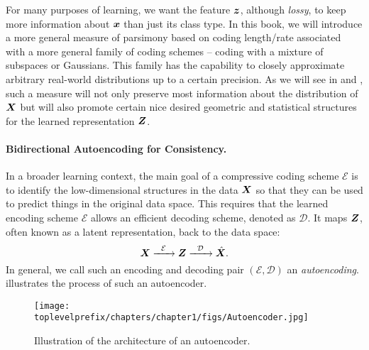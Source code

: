 \documentclass[../../book-main.tex]{subfiles}
\begin{document}
For many purposes of learning, we want the feature $\bm{z}$, although {\em lossy}, to keep more information about $\bm{x}$ than just its class type. In this book, we will introduce a more general measure of parsimony based on coding length/rate associated with a more general family of coding schemes -- coding with a mixture of subspaces or Gaussians. This family has the capability to closely approximate arbitrary real-world distributions up to a certain precision. As we will see in  and , such a measure will not only preserve most information about the distribution of $\bm{X}$ but will also promote certain nice desired geometric and statistical structures for the learned representation $\bm{Z}$. 


\paragraph{Bidirectional Autoencoding for Consistency.}
In a broader learning context, the main goal of a compressive coding scheme $\mathcal{E}$ is to identify the low-dimensional structures in the data $\bm{X}$ so that they can be used to predict things in the original data space. This requires that the learned encoding scheme $\mathcal{E}$ allows an efficient decoding scheme, denoted as $\mathcal D$. It maps $\bm{Z}$, often known as a latent representation, back to the data space:
\begin{equation}
    \bm{X}   \xrightarrow{\hspace{2mm} \mathcal{E}\hspace{2mm}} \bm{Z}  \xrightarrow{\hspace{2mm} \mathcal{D} \hspace{2mm}} \hat {\bm{X}}.
       \label{eqn:auto-encoding}
\end{equation}
In general, we call such an encoding and decoding pair $(\mathcal{E}, \mathcal{D})$ an {\em autoencoding}.  illustrates the process of such an autoencoder. 
\begin{figure}
    \centering
    \texttt{[image: \\toplevelprefix/chapters/chapter1/figs/Autoencoder.jpg]}
    \caption{Illustration of the architecture of an autoencoder. }
    \label{fig:autoencoder}
\end{figure}
\end{document}
